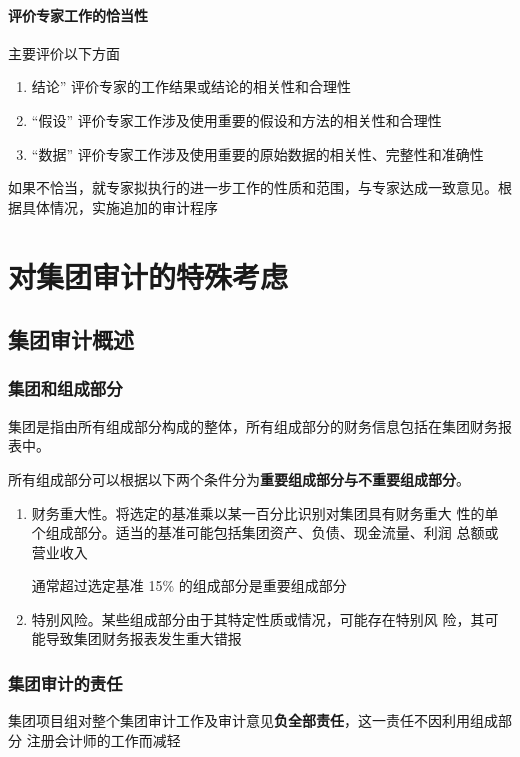\documentclass[UTF8,12pt]{ctexart}
\numberwithin{equation}{section} %
\numberwithin{figure}{section}
\numberwithin{table}{section}
\begin{document}
	\paragraph{评价专家工作的恰当性}
	主要评价以下方面
	\begin{enumerate}
		\item 结论” 评价专家的工作结果或结论的相关性和合理性
		
		\item “假设” 评价专家工作涉及使用重要的假设和方法的相关性和合理性
		
		\item “数据” 评价专家工作涉及使用重要的原始数据的相关性、完整性和准确性
	\end{enumerate}
	
	如果不恰当，就专家拟执行的进一步工作的性质和范围，与专家达成一致意见。根据具体情况，实施追加的审计程序
	
	\newpage
	\section{对集团审计的特殊考虑}
	
	\subsection{集团审计概述}
	
	\subsubsection{集团和组成部分}
	集团是指由所有组成部分构成的整体，所有组成部分的财务信息包括在集团财务报表中。
	
	所有组成部分可以根据以下两个条件分为\textbf{重要组成部分与不重要组成部分}。
	\begin{enumerate}
		\item 财务重大性。将选定的基准乘以某一百分比识别对集团具有财务重大 性的单个组成部分。适当的基准可能包括集团资产、负债、现金流量、利润 总额或营业收入
		
		通常超过选定基准 15\% 的组成部分是重要组成部分
		
		\item 特别风险。某些组成部分由于其特定性质或情况，可能存在特别风 险，其可能导致集团财务报表发生重大错报
	\end{enumerate}
	
	\subsubsection{集团审计的责任}
	集团项目组对整个集团审计工作及审计意见\textbf{负全部责任}，这一责任不因利用组成部分 注册会计师的工作而减轻
	
\end{document}
